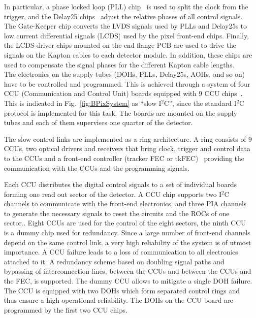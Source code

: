 In particular, a phase locked loop (PLL) chip~\cite{PLLmanual} is used to split the clock from the trigger, and the Delay25 chips~\cite{Delay25manual} adjust the relative phases of all control signals.
The Gate-Keeper chip converts the LVDS signals used by PLLs and Delay25s to low current differential signals (LCDS) used by the pixel front-end chips.
Finally, the LCDS-driver chips mounted on the end flange PCB are used to drive the signals on the Kapton cables to each detector module.
In addition, these chips are used to compensate the signal phases for the different Kapton cable lengths.\\

The electronics on the supply tubes (DOHs, PLLs, Delay25s, AOHs, and so on) have to be controlled and programmed.
This is achieved through a system of four CCU (Communication and Control Unit) boards equipped with 9 CCU chips~\cite{Paillard:593914}.
This is indicated in Fig.~\ref{fig:BPixSystem} as ``slow I$^2$C'', since the standard I$^2$C protocol is implemented for this task.
The boards are mounted on the supply tubes and each of them supervises one quarter of the detector.

The slow control links are implemented as a ring architecture.
A ring consists of 9 CCUs, two optical drivers and receivers that bring clock, trigger and control data to the CCUs
and a front-end controller (tracker FEC or tkFEC)~\cite{Gill:921198}
providing the communication with the CCUs and the programming signals.

Each CCU distributes the digital control signals to a set of individual boards forming one read out sector of the detector.
A CCU chip supports two I$^2$C channels to communicate with the front-end electronics, and three PIA channels to generate the necessary signals to reset the circuits and the ROCs of one sector..
Eight CCUs are used for the control of the eight sectors, the ninth CCU is a dummy chip used for redundancy.
Since a large number of front-end channels depend on the same control link, a very high reliability of the system is of utmost importance.
A CCU failure leads to a loss of communication to all electronics attached to it.
A redundancy scheme based on doubling signal paths and bypassing of interconnection lines, between the CCUs and between the CCUs and the FEC, is supported.
The dummy CCU allows to mitigate a single DOH failure. The CCU is equipped with two DOHs which form separated control rings and thus ensure a high operational reliability.
The DOHs on the CCU board are programmed by the first two CCU chips.

